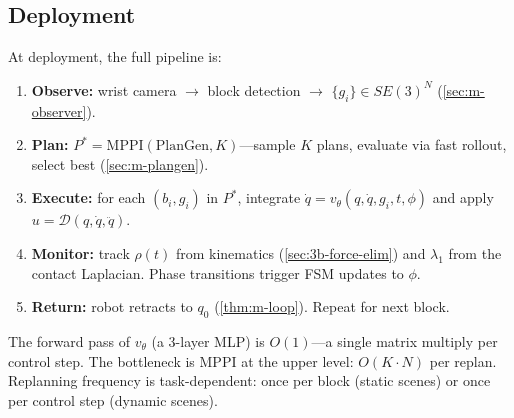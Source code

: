 \subsection{Deployment}

At deployment, the full pipeline is:
\begin{enumerate}[nosep]
  \item \textbf{Observe:} wrist camera $\to$ block detection $\to$
  $\{g_i\} \in SE(3)^N$ (\cref{sec:m-observer}).
  \item \textbf{Plan:} $P^* = \mathrm{MPPI}(\mathrm{PlanGen},
  K)$---sample $K$ plans, evaluate via fast rollout, select best
  (\cref{sec:m-plangen}).
  \item \textbf{Execute:} for each $(b_i, g_i)$ in $P^*$, integrate
  $\dot{q} = v_\theta(q, \dot{q}, g_i, t, \phi)$ and apply
  $u = \mathcal{D}(q, \dot{q}, \ddot{q})$.
  \item \textbf{Monitor:} track $\rho(t)$ from kinematics
  (\cref{sec:3b-force-elim}) and $\lambda_1$ from the contact
  Laplacian.  Phase transitions trigger FSM updates to $\phi$.
  \item \textbf{Return:} robot retracts to $q_0$
  (\cref{thm:m-loop}).  Repeat for next block.
\end{enumerate}

The forward pass of $v_\theta$ (a 3-layer MLP) is $O(1)$---a
single matrix multiply per control step.  The bottleneck is MPPI
at the upper level: $O(K \cdot N)$ per replan.  Replanning
frequency is task-dependent: once per block (static scenes) or
once per control step (dynamic scenes).

